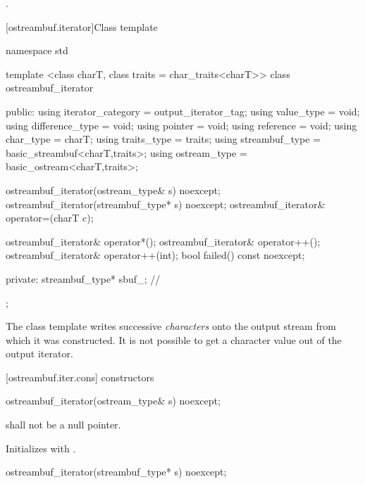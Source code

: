 \begin{itemdescr}
\pnum
\returns
{}.
\end{itemdescr}

[ostreambuf.iterator]{Class template }

%
\begin{codeblock}
namespace std {
  template <class charT, class traits = char_traits<charT>>
  class ostreambuf_iterator {
  public:
    using iterator_category = output_iterator_tag;
    using value_type        = void;
    using difference_type   = void;
    using pointer           = void;
    using reference         = void;
    using char_type         = charT;
    using traits_type       = traits;
    using streambuf_type    = basic_streambuf<charT,traits>;
    using ostream_type      = basic_ostream<charT,traits>;

    ostreambuf_iterator(ostream_type& s) noexcept;
    ostreambuf_iterator(streambuf_type* s) noexcept;
    ostreambuf_iterator& operator=(charT c);

    ostreambuf_iterator& operator*();
    ostreambuf_iterator& operator++();
    ostreambuf_iterator& operator++(int);
    bool failed() const noexcept;

  private:
    streambuf_type* sbuf_;                // \expos
  };
}
\end{codeblock}

\pnum
The
class template
writes successive
\textit{characters}
onto the output stream from which it was constructed.
It is not possible to get a character value out of the output iterator.

[ostreambuf.iter.cons]{ constructors}


%
\begin{itemdecl}
ostreambuf_iterator(ostream_type& s) noexcept;
\end{itemdecl}

\begin{itemdescr}
\pnum
\requires
{}
shall not be a null pointer.

\pnum
\effects
Initializes  with .
\end{itemdescr}


%
\begin{itemdecl}
ostreambuf_iterator(streambuf_type* s) noexcept;
\end{itemdecl}

